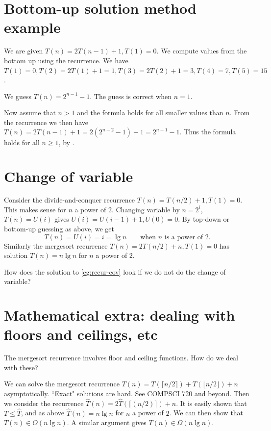 \section{Bottom-up solution method example}
\begin{Boxample}
We are given $T(n) = 2 T(n - 1) + 1, T(1) = 0$. 
We compute values from the bottom up using the recurrence. 
We have $T(1) = 0, T(2) = 2T(1) + 1 = 1, T(3) = 2T(2) + 1 = 3, T(4) = 7, T(5) = 15$. 

We guess $T(n) = 2^{n-1} - 1$. The guess is correct when $n = 1$. 

Now assume that $n > 1$ and the formula holds for all smaller values than $n$. 
From the recurrence we then have 
$T(n) = 2T(n-1) + 1 = 2(2^{n-2} - 1) + 1 = 2^{n-1} - 1$. 
Thus the formula holds for all $n \geq 1$, by .
\end{Boxample}

\section{Change of variable}
\begin{Boxample} \label{eg:recur-cov}
Consider the divide-and-conquer recurrence $T(n) = T(n/2) + 1, T(1) = 0$. 
This makes sense for $n$ a power of $2$.
Changing variable by $n = 2^i$, $T(n) = U(i)$ 
gives $U(i) = U(i-1) + 1, U(0) = 0$. 
By top-down or bottom-up guessing as above, we get 
$$T(n) = U(i) =  i = \lg n \qquad \text{when } n \text{ is a power of }2\text{.}$$
Similarly the mergesort recurrence $T(n) = 2T(n/2) + n, T(1)  = 0$ 
has solution $T(n) = n \lg n$ for $n$ a power of $2$.
\end{Boxample}

\begin{Boxample}[6]
How does the solution to \cref{eg:recur-cov} look if we do not do the change of variable?
\end{Boxample}

\section{Mathematical extra: dealing with floors and ceilings, etc}
The mergesort recurrence involves floor and ceiling functions. How do we deal with these?

We can solve the mergesort recurrence $T(n) = T(\lceil n/2 \rceil) + T(\lfloor n/2 \rfloor) + n$ asymptotically. 
``Exact" solutions are hard. See COMPSCI 720 and beyond. Then we consider the recurrence $\hat{T}(n) =
2\hat{T}(\lceil(n/2)\rceil) + n$. It is easily shown that $T \leq \hat{T}$, and 
as above $\hat{T}(n) = n \lg n$ for $n$ a power of $2$. We can then show that $T(n)
\in O(n \lg n)$. A similar argument gives $T(n) \in \Omega(n \lg n)$.

